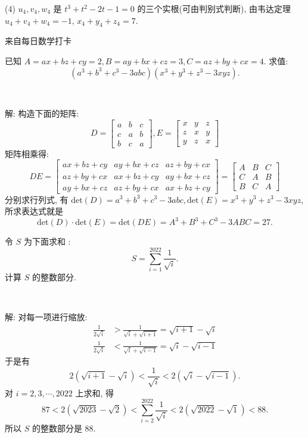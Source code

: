(4) $u_4, v_4, w_4$ 是 $t^3+t^2-2t-1=0$ 的三个实根(可由判别式判断), 由韦达定理 $u_4+v_4+w_4 = -1$, $x_4+y_4+z_4 = 7$.


\newpage
\noindent 来自每日数学打卡

已知 $A = ax + bz + cy = 2, B = ay + bx + cz = 3, C = az + by + cx = 4$. 求值:
\[(a^3+b^3+c^3-3abc)(x^3+y^3+z^3-3xyz) .\]

~

解: 构造下面的矩阵:
\[
D = \begin{bmatrix}
a & b & c \\
c & a & b \\
b & c & a
\end{bmatrix}, 
E = \begin{bmatrix}
x & y & z \\
z & x & y \\
y & z & x
\end{bmatrix}
\]
矩阵相乘得:
\[
DE = \begin{bmatrix}
ax+bz+cy & ay+bx+cz & az+by+cx \\
az+by+cx & ax+bz+cy & ay+bx+cz \\
ay+bx+cz & az+by+cx & ax+bz+cy 
\end{bmatrix} = 
\begin{bmatrix}
A & B & C\\
C & A & B\\
B & C & A 
\end{bmatrix}
\]
分别求行列式, 有 $\mathrm{det}(D) = a^3 + b^3 + c^3 - 3abc, \mathrm{det}(E) = x^3+y^3+z^3-3xyz$, 所求表达式就是 
\[ \mathrm{det}(D)\cdot\mathrm{det}(E) = \mathrm{det}(DE) = A^3+B^3+C^3-3ABC = 27 . \]


\newpage

令 $S$ 为下面求和 :
\[S = \sum_{i=1}^{2022}{\frac{1}{\sqrt{i}}} .\]
计算 $S$ 的整数部分.

~

解: 对每一项进行缩放:
\begin{align*}
\frac{1}{2\sqrt{i}} &> \frac{1}{\sqrt{i}+\sqrt{i+1}} = \sqrt{i+1}-\sqrt{i} \\
\frac{1}{2\sqrt{i}} &< \frac{1}{\sqrt{i}+\sqrt{i-1}} = \sqrt{i}-\sqrt{i-1}
\end{align*}
于是有
\[2(\sqrt{i+1} - \sqrt{i}) < \frac{1}{\sqrt{i}} < 2(\sqrt{i} - \sqrt{i - 1}) .\]
对 $i=2,3,\cdots,2022$ 上求和, 得
\[87 < 2(\sqrt{2023} - \sqrt{2}) < \sum_{i=2}^{2022}{\frac{1}{\sqrt{i}}} < 2(\sqrt{2022} - \sqrt{1}) < 88 .\]
所以 $S$ 的整数部分是 88.



